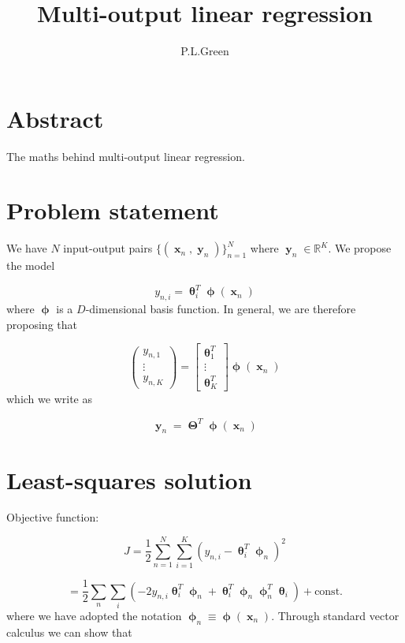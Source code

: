 \documentclass[a4paper, 11pt]{article}
\DeclareMathOperator{\x}{\boldsymbol{x}}
\DeclareMathOperator{\y}{\boldsymbol{y}}
\DeclareMathOperator{\pa}{\boldsymbol{\theta}}
\DeclareMathOperator{\Pa}{\boldsymbol{\Theta}}
\DeclareMathOperator{\bphi}{\boldsymbol{\phi}}
\begin{document}
\title{Multi-output linear regression}
\author{P.L.Green}
\maketitle

\section{Abstract}
The maths behind multi-output linear regression. 

\section{Problem statement}
We have $N$ input-output pairs $\{ (\x_n, \y_n) \}_{n=1}^N$ where $\y_n \in \mathbb{R}^K$. We propose the model

\begin{equation}
	y_{n,i} = \pa^T_i \bphi (\x_n)
\end{equation}
where $\bphi$ is a $D$-dimensional basis function. In general, we are therefore proposing that

\begin{equation}
	\left(
		\begin{array}{c}
			y_{n,1} \\
			\vdots \\
			y_{n,K}
		\end{array}
	\right) = 
	\left[
		\begin{array}{c}
			\pa^T_1 \\
			\vdots \\
			\pa^T_K
		\end{array}
	\right] \bphi(\x_n)
\end{equation}
which we write as

\begin{equation}
	\y_n = \Pa^T \bphi(\x_n)
\end{equation}

\section{Least-squares solution}
Objective function:

\begin{equation}
	J = \frac{1}{2} \sum_{n=1}^N \sum_{i=1}^K 
	\left(
		y_{n,i} - \pa_i^T \bphi_n
	\right)^2
\end{equation}

\begin{equation}
	= \frac{1}{2} \sum_n \sum_i \left(
		-2 y_{n,i} \pa_i^T \bphi_n + \pa_i^T \bphi_n \bphi_n^T \pa_i
	\right) + \text{const.}
\end{equation}
where we have adopted the notation $\bphi_n \equiv \bphi(\x_n)$. Through standard vector calculus we can show that
\end{document}
